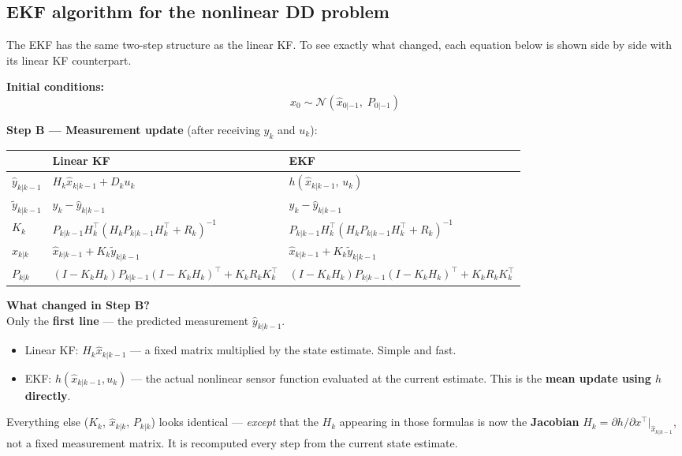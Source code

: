 \documentclass[12pt, a4paper]{article}
\begin{document}
\subsection*{EKF algorithm for the nonlinear DD problem}

The EKF has the same two-step structure as the linear KF.
To see exactly what changed, each equation below is shown side by side
with its linear KF counterpart.

\textbf{Initial conditions:}
\[
  x_0 \sim \mathcal{N}(\hat{x}_{0|-1},\; P_{0|-1})
\]

\textbf{Step B --- Measurement update} (after receiving $y_k$ and $u_k$):

\medskip
\begin{center}
\renewcommand{\arraystretch}{1.6}
\begin{tabular}{p{0.9cm} p{5.2cm} p{5.2cm}}
  \toprule
  & \textbf{Linear KF} & \textbf{EKF} \\
  \midrule
  $\hat{y}_{k|k-1}$ &
    $H_k \hat{x}_{k|k-1} + D_k u_k$ &
    $h(\hat{x}_{k|k-1},\, u_k)$ \\
  $\tilde{y}_{k|k-1}$ &
    $y_k - \hat{y}_{k|k-1}$ &
    $y_k - \hat{y}_{k|k-1}$ \\
  $K_k$ &
    $P_{k|k-1} H_k^\top(H_k P_{k|k-1} H_k^\top + R_k)^{-1}$ &
    $P_{k|k-1} H_k^\top(H_k P_{k|k-1} H_k^\top + R_k)^{-1}$ \\
  $\hat{x}_{k|k}$ &
    $\hat{x}_{k|k-1} + K_k \tilde{y}_{k|k-1}$ &
    $\hat{x}_{k|k-1} + K_k \tilde{y}_{k|k-1}$ \\
  $P_{k|k}$ &
    $(I{-}K_k H_k)P_{k|k-1}(I{-}K_k H_k)^\top + K_k R_k K_k^\top$ &
    $(I{-}K_k H_k)P_{k|k-1}(I{-}K_k H_k)^\top + K_k R_k K_k^\top$ \\
  \bottomrule
\end{tabular}
\end{center}

\begin{notebox}
  \textbf{What changed in Step B?}\\
  Only the \textbf{first line} --- the predicted measurement
  $\hat{y}_{k|k-1}$.
  \begin{itemize}[leftmargin=1.4em, topsep=2pt]
    \item Linear KF: $H_k \hat{x}_{k|k-1}$ --- a fixed matrix
          multiplied by the state estimate. Simple and fast.
    \item EKF: $h(\hat{x}_{k|k-1}, u_k)$ --- the actual nonlinear
          sensor function evaluated at the current estimate.
          This is the \textbf{mean update using $h$ directly}.
  \end{itemize}
  Everything else ($K_k$, $\hat{x}_{k|k}$, $P_{k|k}$) looks
  identical --- \emph{except} that the $H_k$ appearing in those
  formulas is now the \textbf{Jacobian}
  $H_k = \partial h/\partial x^\top|_{\hat{x}_{k|k-1}}$, not a
  fixed measurement matrix.
  It is recomputed every step from the current state estimate.
\end{notebox}
\end{document}
